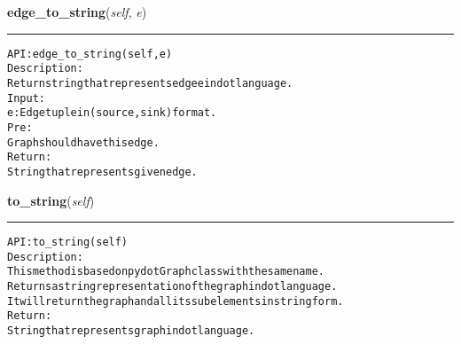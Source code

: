     \label{coinor:gimpy:graph:Graph:edge_to_string}

    \vspace{0.5ex}

\hspace{.8\funcindent}\begin{boxedminipage}{\funcwidth}

    \raggedright \textbf{edge\_to\_string}(\textit{self}, \textit{e})

    \vspace{-1.5ex}

    \rule{\textwidth}{0.5\fboxrule}
\setlength{\parskip}{2ex}
\begin{alltt}

API: edge\_to\_string(self, e)
Description:
Return string that represents edge e in dot language.
Input:
    e: Edge tuple in (source,sink) format.
Pre:
    Graph should have this edge.
Return:
    String that represents given edge.
\end{alltt}

\setlength{\parskip}{1ex}
    \end{boxedminipage}

    \label{coinor:gimpy:graph:Graph:to_string}

    \vspace{0.5ex}

\hspace{.8\funcindent}\begin{boxedminipage}{\funcwidth}

    \raggedright \textbf{to\_string}(\textit{self})

    \vspace{-1.5ex}

    \rule{\textwidth}{0.5\fboxrule}
\setlength{\parskip}{2ex}
\begin{alltt}

API: to\_string(self)
Description:
This method is based on pydot Graph class with the same name.
Returns a string representation of the graph in dot language.
It will return the graph and all its subelements in string form.
Return:
    String that represents graph in dot language.
\end{alltt}

\setlength{\parskip}{1ex}
    \end{boxedminipage}

